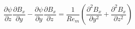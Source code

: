 \documentclass[11pt]{article}
\begin{document}
\begin{equation}
	\frac{\partial \psi}{\partial z}
	\frac{\partial B_x}{\partial y}
	-
	\frac{\partial \psi}{\partial y}
	\frac{\partial B_x}{\partial z}
	=
	\frac{1}{Re_m}
	\left(
	\frac{\partial^2 B_x}{\partial y^2}
	+ \frac{\partial^2 B_x}{\partial z^2}
	\right)
\end{equation}












\end{document}
